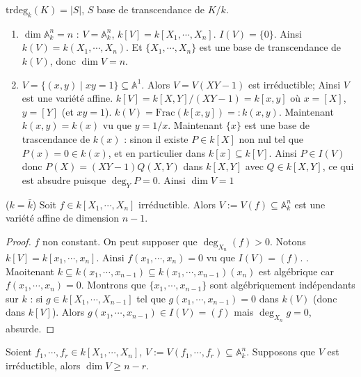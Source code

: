             \begin{defi}
                $\mathrm{trdeg}_k(K) = |S|$, $S$ base de transcendance de $K/k$.
            \end{defi}
            \begin{expl}
                \begin{enumerate}
                    \item $\dim \mathbb{A}_k^n = n$ : $V = \mathbb{A}_k^n$, $k[V] = k[X_1, \cdots, X_n]$. $I(V) = \{0\}$. Ainsi $k(V) = k(X_1, \cdots, X_n)$. Et $\{X_1, \cdots, X_n\}$ est une base de transcendance de $k(V)$, donc $\dim V = n$.
                    \item $V = \{(x,y) \mid xy = 1\} \subseteq \mathbb{A}^1$. Alors $V = V(XY - 1)$ est irréductible; Ainsi $V$ est une variété affine. $k[V] = k[X,Y]/(XY - 1) = k[x,y]$ où $x = [X]$, $y = [Y]$ (et $xy = 1$). $k(V) = \mathrm{Frac} (k[x,y]) =: k(x,y)$. Maintenant $k(x,y) = k(x)$ vu que $y = 1/x$. Maintenant $\{x\}$ est une base de trascendance de $k(x)$ : sinon il existe $P \in k[X]$ non nul tel que $P(x) = 0 \in k(x)$, et en particulier dans $k[x] \subseteq k[V]$. Ainsi $P \in I(V)$ donc $P(X) = (XY - 1)Q(X,Y)$ dans $k[X,Y]$ avec $Q \in k[X,Y]$, ce qui est absudre puisque $\deg_YP = 0$. Ainsi $\dim V = 1$
                \end{enumerate} 
            \end{expl}
            \begin{lemm}
                ($k = \bar k$) Soit $f \in k[X_1, \cdots, X_n]$ irréductible. Alors $V := V(f) \subseteq \mathbb{A}_k^n$ est une variété affine de dimension $n-1$.
            \end{lemm}
            \begin{proof}
                $f$ non constant. On peut supposer que $\deg_{X_n}(f) > 0$. Notons $k[V] = k[x_1, \cdots, x_n]$. Ainsi $f(x_1, \cdots, x_n) = 0$ vu que $I(V) = (f)$. . Maoitenant $k \subseteq k(x_1, \cdots, x_{n-1}) \subseteq k(x_1, \cdots, x_{n-1})(x_n)$ est algébrique car $f(x_1, \cdots, x_n) = 0$. Montrons que $\{x_1, \cdots, x_{n-1}\}$ sont algébriquement indépendants sur $k$ : si $g \in k[X_1, \cdots, X_{n-1}]$ tel que $g(x_1, \cdots, x_{n-1}) = 0$ dans $k(V)$ (donc dans $k[V]$). Alors $g(x_1, \cdots, x_{n-1}) \in I(V) = (f)$ mais $\deg_{X_n} g = 0$, absurde.
            \end{proof}
            \begin{remq}
                \label{rq113}
                Soient $f_1, \cdots, f_r \in k[X_1, \cdots, X_n]$, $V := V(f_1, \cdots, f_r) \subseteq \mathbb{A}^n_k$. Supposons que $V$ est irréductible, alors $\dim V \geq n-r$. 
            \end{remq}
